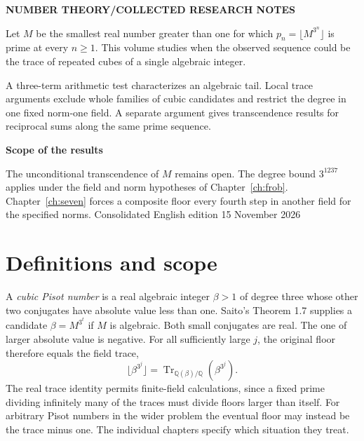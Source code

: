 \documentclass[11pt,a4paper,oneside,openany]{book}
\newcommand{\Q}{\mathbb Q}\newcommand{\C}{\mathbb C}\newcommand{\Z}{\mathbb Z}\newcommand{\F}{\mathbb F}\newcommand{\Tr}{\operatorname{Tr}}\newcommand{\Nm}{\operatorname{N}}\newcommand{\ord}{\operatorname{ord}}\newcommand{\K}{K}\newcommand{\OO}{\mathcal O_K}\newcommand{\unit}{\mathcal U}
\begin{document}
\frontmatter
\thispagestyle{empty}\vspace*{18mm}
{\color{ink}\sffamily\small\bfseries NUMBER THEORY\quad /\quad COLLECTED RESEARCH NOTES\par}
\vspace{8mm}
Let $M$ be the smallest real number greater than one for which $p_n=\lfloor M^{3^n}\rfloor$ is prime at every $n\ge1$. This volume studies when the observed sequence could be the trace of repeated cubes of a single algebraic integer.

A three-term arithmetic test characterizes an algebraic tail. Local trace arguments exclude whole families of cubic candidates and restrict the degree in one fixed norm-one field. A separate argument gives transcendence results for reciprocal sums along the same prime sequence.

\vfill
{\large\bfseries Scope of the results}\par
The unconditional transcendence of $M$ remains open. The degree bound $3^{1237}$ applies under the field and norm hypotheses of Chapter~\ref{ch:frob}. Chapter~\ref{ch:seven} forces a composite floor every fourth step in another field for the specified norms.
\vspace{7mm}{\color{ink}\hrule}\vspace{3mm}
{\sffamily\small Consolidated English edition \hfill 15 November 2026}\clearpage
{}\tableofcontents
\clearpage{}\section*{\color{ink}Definitions and scope}
A \emph{cubic Pisot number} is a real algebraic integer $\beta>1$ of degree three whose other two conjugates have absolute value less than one. Saito's Theorem 1.7 supplies a candidate $\beta=M^{3^t}$ if $M$ is algebraic. Both small conjugates are real. The one of larger absolute value is negative. For all sufficiently large $j$, the original floor therefore equals the field trace,
\[
 \lfloor\beta^{3^j}\rfloor=\operatorname{Tr}_{\Q(\beta)/\Q}(\beta^{3^j}).
\]
The real trace identity permits finite-field calculations, since a fixed prime dividing infinitely many of the traces must divide floors larger than itself. For arbitrary Pisot numbers in the wider problem the eventual floor may instead be the trace minus one. The individual chapters specify which situation they treat.
\end{document}
